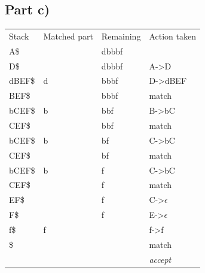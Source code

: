 \documentclass[paper=a4, fontsize=11pt]{scrartcl} %
\numberwithin{equation}{section} %
\numberwithin{figure}{section} %
\numberwithin{table}{section} %
\begin{document}
\subsection{Part c)}
\begin{center}
    \begin{tabular}{ | l | l | l | l | }
    \hline
    Stack       & Matched part      & Remaining     & Action taken          \\
    \hhline{|=|=|=|=|}
    A\$         &                   & dbbbf         &                       \\
    \hline
    D\$         &                   & dbbbf         & A->D                  \\
    \hline
    dBEF\$      & d                 & bbbf          & D->dBEF               \\
    \hline
    BEF\$       &                   & bbbf          & match                 \\
    \hline
    bCEF\$      & b                 & bbf           & B->bC                 \\
    \hline
    CEF\$       &                   & bbf           & match                 \\
    \hline
    bCEF\$      & b                 & bf            & C->bC                 \\
    \hline
    CEF\$       &                   & bf            & match                 \\
    \hline
    bCEF\$      & b                 & f             & C->bC                 \\
    \hline
    CEF\$       &                   & f             & match                 \\
    \hline
    EF\$        &                   & f             & C->$\epsilon$         \\
    \hline
    F\$         &                   & f             & E->$\epsilon$         \\
    \hline
    f\$         & f                 &               & f->f                  \\
    \hline
    \$          &                   &               & match                 \\
    \hline
                &                   &               & \em{accept}           \\
    \hline
    \end{tabular}
\end{center}
\end{document}
